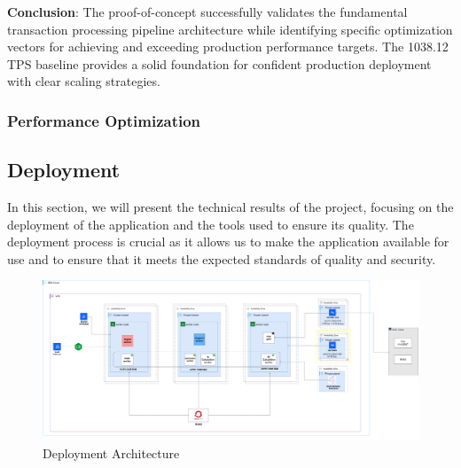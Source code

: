 \textbf{Conclusion}: The proof-of-concept successfully validates the fundamental transaction processing pipeline architecture while identifying specific optimization vectors for achieving and exceeding production performance targets. The 1038.12 TPS baseline provides a solid foundation for confident production deployment with clear scaling strategies.

\subsubsection{Performance Optimization}


\subsection{Deployment}
In this section, we will present the technical results of the project, focusing on the deployment of the application and the tools used to ensure its quality. 
The deployment process is crucial as it allows us to make the application available for use and to ensure that it meets the expected standards of quality and security.


\begin{figure}
    \centering
    \includegraphics[width=1\textwidth]{img/arch/p2s-workers-deployment.drawio.png}
    \caption{Deployment Architecture}
    \label{fig:deployment}
\end{figure}
  
